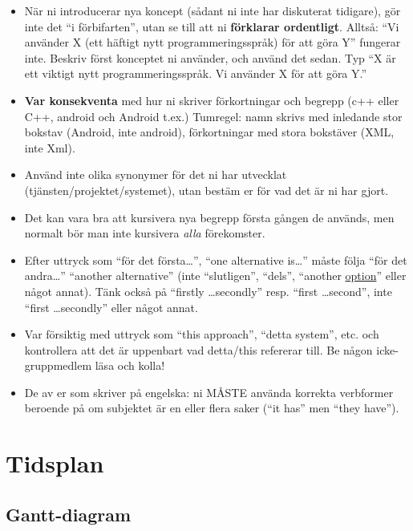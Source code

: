 \documentclass[swedish, a4paper,12pt]{article}
\begin{document}
\begin{itemize}
\item    När ni introducerar nya koncept (sådant ni inte har diskuterat tidigare), gör inte det ``i förbifarten'', utan se till att ni \textbf{förklarar ordentligt}.  Alltså: ``Vi använder X (ett häftigt nytt programmeringsspråk) för att göra Y'' fungerar inte.  Beskriv först konceptet ni använder, och använd det sedan.  Typ ``X är ett viktigt nytt programmeringsspråk.  Vi använder X för att göra Y.''

\item    \textbf{Var konsekventa} med hur ni skriver förkortningar och begrepp (c++ eller C++, android och Android t.ex.) Tumregel: namn skrivs med inledande stor bokstav (Android, inte android), förkortningar med stora bokstäver (XML, inte Xml).
\item    Använd inte olika synonymer för det ni har utvecklat (tjänsten/projektet/systemet), utan bestäm er för vad det är ni har gjort.

\item    Det kan vara bra att kursivera nya begrepp första gången de används, men normalt bör man inte kursivera \emph{alla} förekomster.

\item    Efter uttryck som ``för det första\ldots'', ``one alternative is\ldots'' måste följa ``för det andra\ldots'' ``another alternative'' (inte ``slutligen'', ``dels'', ``another \underline{option}'' eller något annat).  Tänk också på ``firstly \ldots secondly'' resp. ``first \ldots second'', inte ``first \ldots secondly'' eller något annat.

\item    Var försiktig med uttryck som ``this approach'', ``detta system'', etc. och kontrollera att det är uppenbart vad detta/this refererar till. Be någon icke-gruppmedlem läsa och kolla!

\item    De av er som skriver på engelska: ni MÅSTE använda korrekta verbformer beroende på om subjektet är en eller flera saker (``it has'' men ``they have'').
\end{itemize}
\fi

\iffalse
\section{Tidsplan}
\subsection{Gantt-diagram}
\end{document}
